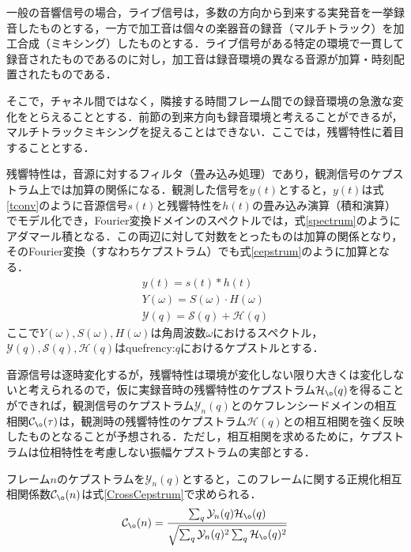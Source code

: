 \documentclass[technicalreport]{ieicej}
\begin{document}
一般の音響信号の場合，ライブ信号は，多数の方向から到来する実発音を一挙録音したものとする，一方で加工音は個々の楽器音の録音（マルチトラック）を加工合成（ミキシング）したものとする．ライブ信号がある特定の環境で一貫して録音されたものであるのに対し，加工音は録音環境の異なる音源が加算・時刻配置されたものである．

そこで，チャネル間ではなく，隣接する時間フレーム間での録音環境の急激な変化をとらえることとする．前節の到来方向も録音環境と考えることができるが，マルチトラックミキシングを捉えることはできない．ここでは，残響特性に着目することとする．

残響特性は，音源に対するフィルタ（畳み込み処理）であり，観測信号のケプストラム上では加算の関係になる．観測した信号を$y(t)$とすると，$y(t)$は式\eqref{tconv}のように音源信号$s(t)$と残響特性を$h(t)$の畳み込み演算（積和演算）でモデル化でき，Fourier変換ドメインのスペクトルでは，式\eqref{spectrum}のようにアダマール積となる．この両辺に対して対数をとったものは加算の関係となり，そのFourier変換（すなわちケプストラム）でも式\eqref{cepstrum}のように加算となる．
\begin{gather}
y(t) = s(t) * h(t) \label{tconv}\\
Y(\omega) = S(\omega) \cdot H(\omega) \label{spectrum}\\
\mathcal{Y}(q) = \mathcal{S}(q) + \mathcal{H}(q) \label{cepstrum}
\end{gather}
ここで$Y(\omega), S(\omega), H(\omega)$は角周波数$\omega$におけるスペクトル，$\mathcal{Y}(q), \mathcal{S}(q), \mathcal{H}(q)$はquefrency:$q$におけるケプストルとする．

音源信号は逐時変化するが，残響特性は環境が変化しない限り大きくは変化しない\cite{yYyOyY_ExtRTFbHSP_MASJ2014s}と考えられるので，仮に実録音時の残響特性のケプストラム$\mathcal{H}_{\o}(q)$を得ることができれば，観測信号のケプストラム$\mathcal{Y}_{n}(q)$とのケフレンシードメインの相互相関$\mathcal{C}_{\o}(\tau)$は，観測時の残響特性のケプストラム$\mathcal{H}(q)$との相互相関を強く反映したものとなることが予想される．ただし，相互相関を求めるために，ケプストラムは位相特性を考慮しない振幅ケプストラムの実部とする．

フレーム$n$のケプストラムを$\mathcal{Y}_{n}(q)$とすると，このフレームに関する正規化相互相関係数$\mathcal{C}_{\o}(n)$は式\eqref{CrossCepstrum}で求められる．
\begin{gather}
\mathcal{C}_{\o}(n) 
= \frac{%
	\sum_{q}\mathcal{Y}_{n}(q)\mathcal{H}_{\o}(q)
}{%
\sqrt{\sum_{q}\mathcal{Y}_{n}(q)^2\sum_{q}\mathcal{H}_{\o}(q)^2}
} \label{CrossCepstrum}
\end{gather}
\end{document}
